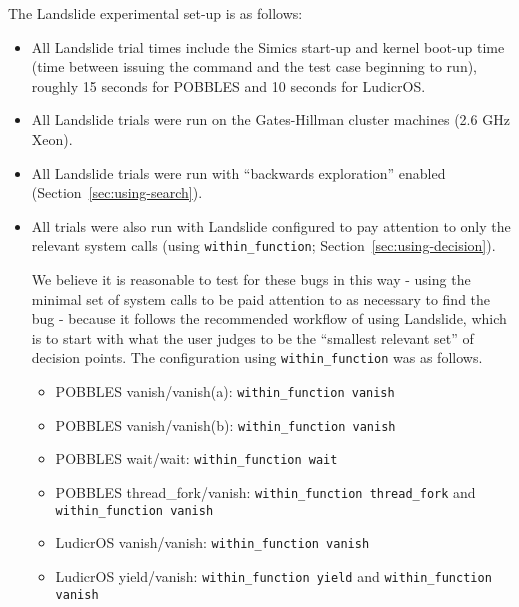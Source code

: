 The Landslide experimental set-up is as follows:

\begin{itemize}
	\item All Landslide trial times include the Simics start-up and kernel boot-up time (time between issuing the command and the test case beginning to run), roughly 15 seconds for POBBLES and 10 seconds for LudicrOS.
	\item All Landslide trials were run on the Gates-Hillman cluster machines (2.6 GHz Xeon).
	\item All Landslide trials were run with ``backwards exploration'' enabled (Section~\ref{sec:using-search}).
	\item All trials were also run with Landslide configured to pay attention to only the relevant system calls (using \texttt{within\_function}; Section~\ref{sec:using-decision}).

	We believe it is reasonable to test for these bugs in this way - using the minimal set of system calls to be paid attention to as necessary to find the bug - because it follows the recommended workflow of using Landslide, which is to start with what the user judges to be the ``smallest relevant set'' of decision points. The configuration using \texttt{within\_function} was as follows.
	{\small
	\begin{itemize}
		\item POBBLES vanish/vanish(a): \texttt{within\_function vanish}
		\item POBBLES vanish/vanish(b): \texttt{within\_function vanish}
		\item POBBLES wait/wait: \texttt{within\_function wait}
		\item POBBLES thread\_fork/vanish: \texttt{within\_function thread\_fork} and \texttt{within\_function vanish}
		\item LudicrOS vanish/vanish: \texttt{within\_function vanish}
		\item LudicrOS yield/vanish: \texttt{within\_function yield} and \texttt{within\_function vanish}
	\end{itemize}
	}
\end{itemize}

%

